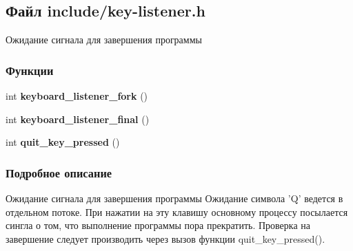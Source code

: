 \hypertarget{key-listener_8h}{\subsection{Файл include/key-\/listener.h}
\label{key-listener_8h}
}


Ожидание сигнала для завершения программы  


\subsubsection*{Функции}
\begin{DoxyCompactItemize}
\item 
\hypertarget{key-listener_8h_afce84267d242a67489ca201c43c8cae6}{int {\bfseries keyboard\-\_\-listener\-\_\-fork} ()}\label{key-listener_8h_afce84267d242a67489ca201c43c8cae6}

\item 
\hypertarget{key-listener_8h_a0542378d05d3c52577c6f23db16bea6b}{int {\bfseries keyboard\-\_\-listener\-\_\-final} ()}\label{key-listener_8h_a0542378d05d3c52577c6f23db16bea6b}

\item 
\hypertarget{key-listener_8h_a25d43c3904f4a26b458c753fd7d83c26}{int {\bfseries quit\-\_\-key\-\_\-pressed} ()}\label{key-listener_8h_a25d43c3904f4a26b458c753fd7d83c26}

\end{DoxyCompactItemize}


\subsubsection{Подробное описание}
Ожидание сигнала для завершения программы Ожидание символа 'Q' ведется в отдельном потоке. При нажатии на эту клавишу основному процессу посылается сингла о том, что выполнение программы пора прекратить. Проверка на завершение следует производить через вызов функции quit\-\_\-key\-\_\-pressed(). 